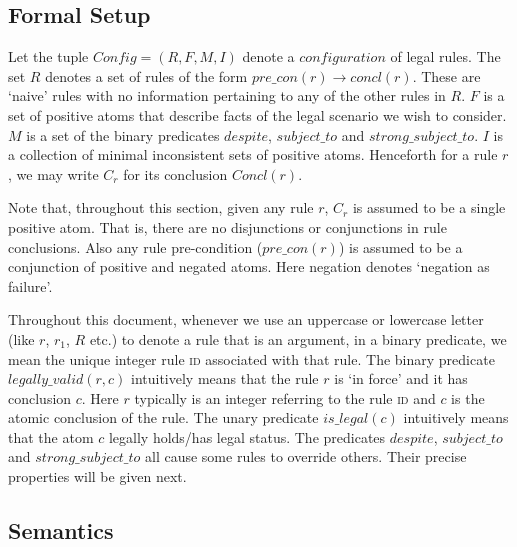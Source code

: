 \subsection{Formal Setup}
Let the tuple $Config = (R,F,M,I)$ denote a $configuration$ of legal rules. The set $R$ denotes a set of rules of the form $pre\_con(r)\rightarrow concl(r)$. These are `naive' rules with no information pertaining to any of the other rules in $R$. $F$ is a set of positive atoms that describe facts of the legal scenario we wish to consider. $M$ is a set of the binary predicates $despite$, $subject\_to$ and $strong\_subject\_to$. $I$ is a collection of minimal inconsistent sets of positive atoms. Henceforth for a rule $r$, we may write $C_{r}$ for its conclusion $Concl(r)$.

Note that, throughout this section, given any rule $r$, $C_{r}$ is assumed to be a single positive atom. That is, there are no disjunctions or conjunctions in rule conclusions. Also any rule pre-condition ($pre\_con(r)$) is assumed to be a conjunction of positive and negated atoms. Here negation denotes `negation as failure'.  

Throughout this document, whenever we use an uppercase or lowercase letter (like $r$, $r_{1}$, $R$ etc.) to denote a rule that is an argument, in a binary predicate, we mean the unique integer rule \textsc{id} associated with that rule. The binary predicate $legally\_valid(r,c)$ intuitively means that the rule $r$ is `in force' and it has conclusion $c$. Here $r$ typically is an integer referring to the rule \textsc{id} and $c$ is the atomic conclusion of the rule. The unary predicate $is\_legal(c)$ intuitively means that the atom $c$ legally holds/has legal status. The predicates $despite$, $subject\_to$ and $strong\_subject\_to$ all cause some rules to override others. Their precise properties will be given next.


\subsection{Semantics}

